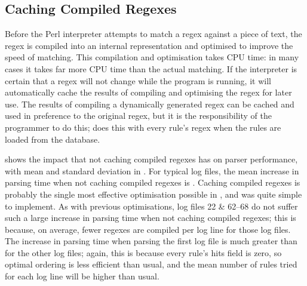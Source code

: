 \FloatBarrier{}

\subsection{Caching Compiled Regexes}

\label{Caching compiled regexes}

Before the Perl interpreter attempts to match a regex against a piece of
text, the regex is compiled into an internal representation and optimised
to improve the speed of matching.  This compilation and optimisation takes
CPU time: in many cases it takes far more CPU time than the actual
matching.  If the interpreter is certain that a regex will not change while
the program is running, it will automatically cache the results of
compiling and optimising the regex for later use.  The results of compiling
a dynamically generated regex can be cached and used in preference to the
original regex, but it is the responsibility of the programmer to do this;
\parsername{} does this with every rule's regex when the rules are loaded
from the database.

shows the impact that not caching compiled regexes has on parser
performance, with mean and standard deviation in .  For typical log
files, the mean increase in parsing time when not caching compiled regexes
is .  Caching
compiled regexes is probably the single most effective optimisation
possible in \parsername{}, and was quite simple to implement.  As with
previous optimisations, log files 22 \& 62--68 do not suffer such a large
increase in parsing time when not caching compiled regexes; this is
because, on average, fewer regexes are compiled per log line for those log
files.  The increase in parsing time when parsing the first log file is
much greater than for the other log files; again, this is because every
rule's hits field is zero, so optimal ordering is less efficient than
usual, and the mean number of rules tried for each log line will be higher
than usual.



